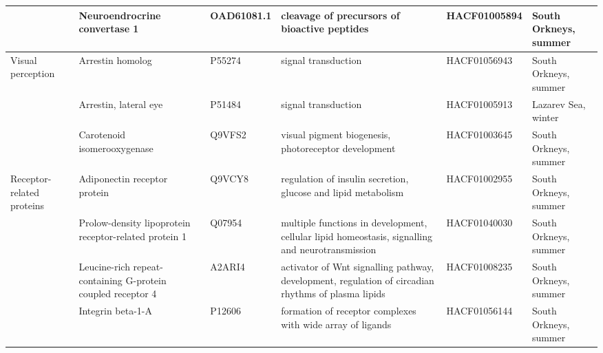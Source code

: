{\begin{longtable}{@{}L{1.8cm}L{3cm}L{2cm}L{2.5cm}L{1.75cm}L{2.5cm}@{}}
                                       & Neuroendrocrine convertase 1                                            & OAD61081.1                              & cleavage of precursors of bioactive peptides                                                         & HACF01005894       & South Orkneys, summer                \\* \midrule
Visual perception                      & Arrestin homolog                                                        & P55274                                  & signal transduction                                                                                  & HACF01056943       & South Orkneys, summer                \\
                                       & Arrestin, lateral eye                                                   & P51484                                  & signal transduction                                                                                  & HACF01005913       & Lazarev Sea, winter                  \\
                                       & Carotenoid isomerooxygenase                                             & Q9VFS2                                  & visual pigment biogenesis, photoreceptor development                                                 & HACF01003645       & South Orkneys, summer                \\* \midrule
Receptor-related proteins              & Adiponectin receptor protein                                            & Q9VCY8                                  & regulation of insulin secretion, glucose and lipid metabolism                                        & HACF01002955       & South Orkneys, summer                \\
                                       & Prolow-density lipoprotein receptor-related protein 1                   & Q07954                                  & multiple functions in development, cellular lipid homeostasis, signalling and neurotransmission      & HACF01040030       & South Orkneys, summer                \\
                                       & Leucine-rich repeat-containing G-protein coupled receptor 4             & A2ARI4                                  & activator of Wnt signalling pathway, development, regulation of circadian rhythms of plasma lipids   & HACF01008235       & South Orkneys, summer                \\
                                       & Integrin beta-1-A                                                       & P12606                                  & formation of receptor complexes with wide array of ligands                                           & HACF01056144       & South Orkneys, summer                \\

\end{longtable}}
